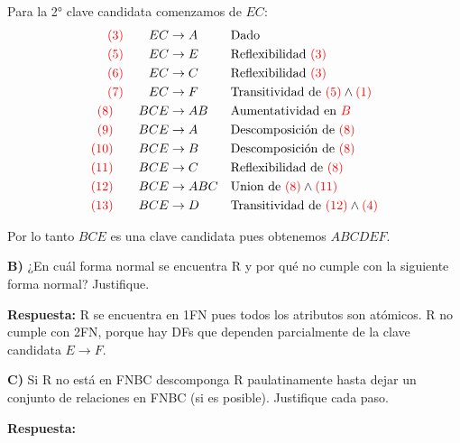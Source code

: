 \documentclass{templateNote}
\begin{document}
\begin{enumerate}
    \hrulefill

    Para la 2° clave candidata comenzamos de $EC$:
    \begin{align*}
        \textcolor{red}{(3)} \qquad EC &\rightarrow A && \text{Dado} \\
        \textcolor{red}{(5)} \qquad EC &\rightarrow E && \text{Reflexibilidad } \textcolor{red}{(3)} \\
        \textcolor{red}{(6)} \qquad EC &\rightarrow C && \text{Reflexibilidad } \textcolor{red}{(3)} \\
        \textcolor{red}{(7)} \qquad EC &\rightarrow F && \text{Transitividad de } \textcolor{red}{(5)} \wedge \textcolor{red}{(1)} \\
        \textcolor{red}{(8)} \qquad BCE &\rightarrow AB && \text{Aumentatividad en } \textcolor{red}{B} \\
        \textcolor{red}{(9)} \qquad BCE &\rightarrow A && \text{Descomposición de } \textcolor{red}{(8)} \\
        \textcolor{red}{(10)} \qquad BCE &\rightarrow B && \text{Descomposición de } \textcolor{red}{(8)} \\
        \textcolor{red}{(11)} \qquad BCE &\rightarrow C && \text{Reflexibilidad de } \textcolor{red}{(8)} \\
        \textcolor{red}{(12)} \qquad BCE &\rightarrow ABC && \text{Union de } \textcolor{red}{(8)} \wedge \textcolor{red}{(11)}\\
        \textcolor{red}{(13)} \qquad BCE &\rightarrow D && \text{Transitividad de } \textcolor{red}{(12)} \wedge \textcolor{red}{(4)}\\
    \end{align*}
    
    Por lo tanto $BCE$ es una clave candidata pues obtenemos $ABCDEF$.
    
    \newpage
    \textbf{B)} ¿En cuál forma normal se encuentra R y por qué no cumple con la siguiente forma normal? Justifique.

    \textbf{Respuesta:} R se encuentra en 1FN pues todos los atributos son atómicos. R no cumple con 2FN, porque hay DFs que dependen parcialmente de la clave candidata $E \rightarrow F$.

    \hrulefill

    \textbf{C)} Si R no está en FNBC descomponga R paulatinamente hasta dejar un conjunto de relaciones en FNBC (si es posible). Justifique cada paso.

    \textbf{Respuesta:} 
    

\end{enumerate}
\end{document}
